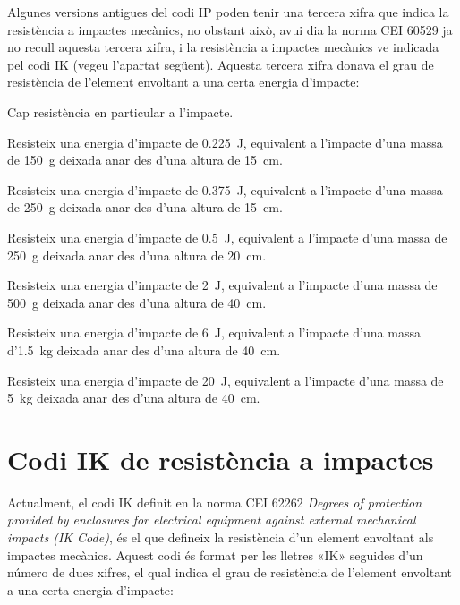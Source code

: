 Algunes versions antigues del codi IP poden tenir una tercera xifra que indica la resistència a impactes mecànics, no obstant això, avui  dia la norma CEI 60529 ja no recull aquesta tercera xifra, i la resistència a impactes mecànics ve indicada pel codi IK (vegeu l'apartat següent). Aquesta tercera xifra donava el grau de resistència de l'element envoltant a una certa energia d'impacte:
\begin{list}{}
	{\setlength{\labelwidth}{10mm} \setlength{\leftmargin}{15mm} \setlength{\labelsep}{5mm}}
	\item[0] Cap resistència en particular a l'impacte.
	\item[1] Resisteix una energia d'impacte de \qty{0,225}{J}, equivalent a l'impacte d'una massa de \qty{150}{g} deixada anar des d'una altura de \qty{15}{cm}.
	\item[2] Resisteix una energia d'impacte de \qty{0,375}{J}, equivalent a l'impacte d'una massa de \qty{250}{g} deixada anar des d'una altura de \qty{15}{cm}.
	\item[3] Resisteix una energia d'impacte de \qty{0,5}{J}, equivalent a l'impacte d'una massa de \qty{250}{g} deixada anar des d'una altura de \qty{20}{cm}.
	\item[5] Resisteix una energia d'impacte de \qty{2}{J}, equivalent a l'impacte d'una massa de \qty{500}{g} deixada anar des d'una altura de \qty{40}{cm}.
	\item[7] Resisteix una energia d'impacte de \qty{6}{J}, equivalent a l'impacte d'una massa d'\qty{1,5}{kg} deixada anar des d'una altura de \qty{40}{cm}.
	\item[9]Resisteix una energia d'impacte de \qty{20}{J}, equivalent a l'impacte d'una massa de \qty{5}{kg} deixada anar des d'una altura de \qty{40}{cm}.
\end{list}

\section{Codi IK de resistència a impactes}\label{sec:codi-IK}   

Actualment, el codi IK definit en la norma CEI 62262 \textit{Degrees of protection provided by enclosures for electrical equipment against external mechanical impacts (IK Code)}, és el que defineix la resistència d'un element  envoltant als impactes mecànics. Aquest codi és format per les lletres «IK» seguides d'un número de dues xifres, el qual indica el grau de resistència de l'element envoltant a una certa energia d'impacte:

